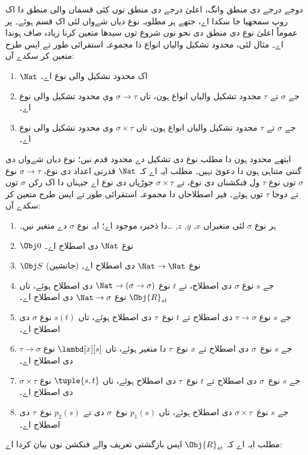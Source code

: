 \documentclass[../../../include/open-logic-section]{subfiles}
\begin{document}
دوجے درجے دی منطق وانگ،
اعلیٰ درجے دی منطق نوں
کئی قسماں والی منطق دا
اک روپ سمجھیا جا سکدا اے،
جتھے ہر مطلوبہ نوع دیاں
شےواں لئی اک قسم ہوئے۔
پر عموماً اعلیٰ نوع دی
منطق دی نحو نوں شروع
توں سیدھا متعین کرنا
زیادہ صاف ہوندا اے۔
مثال لئی، محدود تشکیل
والیاں انواع دا مجموعہ
استقرائی طور تے ایس
طرح متعین کر سکدے آں:
\begin{enumerate}
\item $\Nat$ اک محدود تشکیل والی نوع اے۔
\item جے $\sigma$ تے $\tau$ محدود تشکیل
  والیاں انواع ہون، تاں $\sigma
  \to \tau$ وی محدود تشکیل والی نوع اے۔
\item جے $\sigma$ تے $\tau$ محدود تشکیل
  والیاں انواع ہون، تاں $\sigma \times
  \tau$ وی محدود تشکیل والی نوع اے۔
\end{enumerate}
ایتھے محدود ہون دا مطلب نوع دی تشکیل دے محدود
قدم نیں؛ نوع دیاں شےواں دی گنتی متناہی ہون دا
دعویٰ نہیں۔
مطلب ایہ اے کہ $\Nat$
قدرتی اعداد دی نوع،
$\sigma \to \tau$ نوع
$\sigma$ توں نوع $\tau$
ول فنکشناں دی نوع،
تے $\sigma \times \tau$
جوڑیاں دی نوع اے
جیہناں دا اک رکن
$\sigma$ توں تے دوجا
$\tau$ توں ہوئے۔
فیر اصطلاحاں دا
مجموعہ استقرائی طور
تے ایس طرح متعین
کر سکدے آں:
\begin{enumerate}
\item ہر نوع $\sigma$ لئی
  متغیراں $x$, $y$,
  $z$, \dots دا
  ذخیرہ موجود اے؛
  ایہ نوع $\sigma$
  دے متغیر نیں۔
\item $\Obj 0$ نوع $\Nat$
  دی اصطلاح اے۔
\item $\Obj S$ (جانشین)
  نوع $\Nat \to \Nat$
  دی اصطلاح اے۔
\item جے $s$ نوع $\sigma$
  دی اصطلاح، تے $t$
  نوع $\Nat \to (\sigma \to \sigma)$
  دی اصطلاح ہوئے، تاں
  $\Obj{R}_{st}$ نوع
  $\Nat \to \sigma$
  دی اصطلاح اے۔
\item جے $s$ نوع
  $\tau \to \sigma$ دی
  اصطلاح تے $t$
  نوع~$\tau$ دی اصطلاح
  ہوئے، تاں $s(t)$
  نوع $\sigma$ دی
  اصطلاح اے۔
\item جے $s$ نوع~$\sigma$
  دی اصطلاح تے $x$
  نوع~$\tau$ دا متغیر
  ہوئے، تاں $\lambd[x][s]$
  نوع $\tau \to \sigma$
  دی اصطلاح اے۔
\item جے $s$ نوع~$\sigma$
  دی اصطلاح تے $t$
  نوع~$\tau$ دی اصطلاح
  ہوئے، تاں $\tuple{s, t}$
  نوع $\sigma \times
  \tau$ دی اصطلاح اے۔
\item جے $s$ نوع~$\sigma \times \tau$
  دی اصطلاح ہوئے، تاں
  $p_1(s)$ نوع~$\sigma$
  دی تے $p_2(s)$
  نوع~$\tau$ دی اصطلاح
  اے۔
\end{enumerate}
مطلب ایہ اے کہ
$\Obj{R}_{st}$ ایس
بازگشتی تعریف والے
فنکشن نوں بیان کردا اے:
\end{document}
